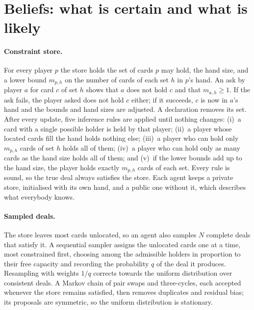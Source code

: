\documentclass{article}
\begin{document}
\section{Beliefs: what is certain and what is likely}
\label{sec:belief}

\paragraph{Constraint store.}
For every player $p$ the store holds the set of cards $p$ may hold, the hand
size, and a lower bound $m_{p,h}$ on the number of cards of each set $h$ in
$p$'s hand.  An ask by player $a$ for card $c$ of set $h$ shows that $a$ does
not hold $c$ and that $m_{a,h} \ge 1$.  If the ask fails, the player asked does
not hold $c$ either; if it succeeds, $c$ is now in $a$'s hand and the bounds
and hand sizes are adjusted.  A declaration removes its set.  After every
update, five inference rules are applied until nothing changes: (i)~a card with
a single possible holder is held by that player; (ii)~a player whose located
cards fill the hand holds nothing else; (iii)~a player who can hold only
$m_{p,h}$ cards of set $h$ holds all of them; (iv)~a player who can hold only
as many cards as the hand size holds all of them; and (v)~if the lower bounds
add up to the hand size, the player holds exactly $m_{p,h}$ cards of each set.
Every rule is sound, so the true deal always satisfies the store.  Each agent
keeps a private store, initialised with its own hand, and a public one without
it, which describes what everybody knows.

\paragraph{Sampled deals.}
The store leaves most cards unlocated, so an agent also samples $N$ complete
deals that satisfy it.  A sequential sampler assigns the unlocated cards one at
a time, most constrained first, choosing among the admissible holders in
proportion to their free capacity and recording the probability $q$ of the deal
it produces.  Resampling with weights $1/q$ corrects towards the uniform
distribution over consistent deals.  A Markov chain of pair swaps and
three-cycles, each accepted whenever the store remains satisfied, then removes
duplicates and residual bias; its proposals are symmetric, so the uniform
distribution is stationary.
\end{document}
